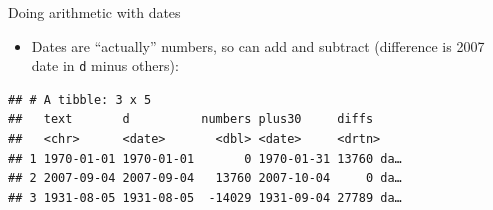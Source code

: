 \documentclass[ignorenonframetext,]{beamer}
\newenvironment{Shaded}{\begin{snugshade}}{\end{snugshade}}
\newcommand{\DataTypeTok}[1]{\textcolor[rgb]{0.13,0.29,0.53}{#1}}
\newcommand{\DecValTok}[1]{\textcolor[rgb]{0.00,0.00,0.81}{#1}}
\newcommand{\KeywordTok}[1]{\textcolor[rgb]{0.13,0.29,0.53}{\textbf{#1}}}
\newcommand{\NormalTok}[1]{#1}
\newcommand{\OperatorTok}[1]{\textcolor[rgb]{0.81,0.36,0.00}{\textbf{#1}}}
\newcommand{\StringTok}[1]{\textcolor[rgb]{0.31,0.60,0.02}{#1}}
\providecommand{\tightlist}{%
  \setlength{\itemsep}{0pt}\setlength{\parskip}{0pt}}
\begin{document}
\begin{frame}[fragile]{Doing arithmetic with dates}
\protect\hypertarget{doing-arithmetic-with-dates}{}

\begin{itemize}
\tightlist
\item
  Dates are ``actually'' numbers, so can add and subtract (difference is
  2007 date in \texttt{d} minus others):
\end{itemize}

\begin{Shaded}
\end{Shaded}

\begin{verbatim}
## # A tibble: 3 x 5
##   text       d          numbers plus30     diffs    
##   <chr>      <date>       <dbl> <date>     <drtn>   
## 1 1970-01-01 1970-01-01       0 1970-01-31 13760 da…
## 2 2007-09-04 2007-09-04   13760 2007-10-04     0 da…
## 3 1931-08-05 1931-08-05  -14029 1931-09-04 27789 da…
\end{verbatim}

\end{frame}
\end{document}
